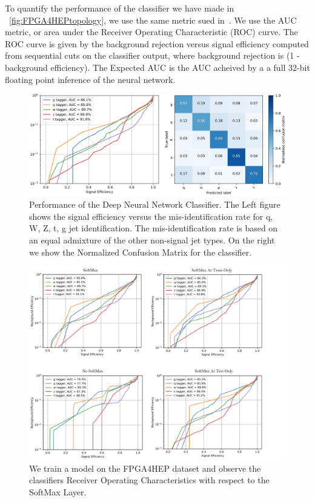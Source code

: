To quantify the performance of the classifier we have made in ~\cref{fig:FPGA4HEPtopology}, we use the same metric sued in~\cite{Duarte_2018}. We use the AUC metric, or area under the Receiver Operating Characteristic (ROC) curve. The ROC curve is given by the background rejection versus signal efficiency computed from sequential cuts on the classifier output, where background rejection is (1 - background efficiency). The Expected AUC is the AUC acheived by a a full 32-bit floating point inference of the neural network. 

\begin{figure}[h]
    \centering
    \includegraphics[width=320pt]{figures/bison/classifierperform.png}
    \caption{Performance of the Deep Neural Network Classifier. The Left figure shows the signal efficiency versus the mis-identification rate for q, W, Z, t, g jet identification. The mis-identification rate is based on an equal admixture of the other non-signal jet types. On the right we show the Normalized Confusion Matrix for the classifier.}
    \label{fig:classifierperform}
\end{figure}

\begin{figure}[h]
    \centering
    \includegraphics[width=400pt]{figures/bison/SoftMaxTests.png}
    \caption{We train a model on the FPGA4HEP dataset and observe the classifiers Receiver Operating Characteristics with respect to the SoftMax Layer.}
    \label{fig:softmaxtests}
\end{figure}




